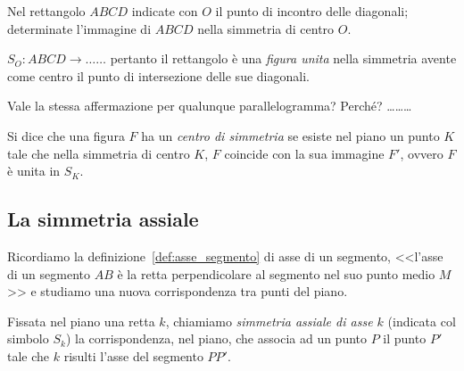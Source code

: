 \begin{exrig}
\begin{esempio}
Nel rettangolo \(ABCD\) indicate con \(O\) il punto di incontro delle 
diagonali; determinate l'immagine di \(ABCD\) nella simmetria di centro 
\(O\).

\(S_O:ABCD \rightarrow \ldots\ldots{}\) pertanto il rettangolo è una 
\emph{figura unita} nella simmetria avente come centro il punto di 
intersezione delle sue diagonali.

\begin{figure*}[!htb]
    \centering
\end{figure*}

Vale la stessa affermazione per qualunque parallelogramma? Perché? 
\ldots\ldots\ldots{}

\begin{figure*}[!htb]
    \centering
\end{figure*}

\end{esempio}
\end{exrig}

\begin{definizione}
Si dice che una figura \(F\) ha un \emph{centro di simmetria} se esiste 
nel piano un punto \(K\) tale che nella simmetria di centro \(K\), \(F\) 
coincide con la sua immagine \(F'\), ovvero \(F\) è unita in \(S_K\). 
\end{definizione}

\subsection{La simmetria assiale}

Ricordiamo la definizione~\ref{def:asse_segmento} di asse di un 
segmento, <<l'asse di un segmento \(AB\) è la retta perpendicolare al 
segmento nel suo punto medio \(M\)>> e studiamo una nuova 
corrispondenza tra punti del piano.

\begin{definizione}
Fissata nel piano una retta \(k\), chiamiamo \emph{simmetria assiale di 
asse \(k\)} (indicata col simbolo \(S_k\)) la corrispondenza, nel piano, 
che associa ad un punto \(P\) il punto \(P'\) tale che \(k\) risulti l'asse 
del segmento \(PP'\).
\end{definizione}

